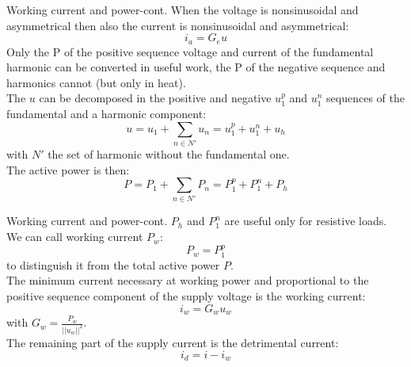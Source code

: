 \documentclass[aspectratio=169]{beamer}
\begin{document}
  \begin{frame}{Working current and power-cont.}{\insertsection}
    When the voltage is nonsinusoidal and asymmetrical then also the current is nonsinusoidal and asymmetrical: 
    \begin{equation}
      \pmb{\mathit{i}}_a = G_e \pmb{\mathit{u}}
    \end{equation} 
    Only the P of the positive sequence voltage and current of the fundamental harmonic can be converted in useful work, the P of the negative sequence and harmonics cannot (but only in heat). \\
    The  $ \pmb{\mathit{u}}$ can be decomposed in the positive and negative $ \pmb{\mathit{u}}_{1}^{p}$ and $ \pmb{\mathit{u}}_{1}^{n}$ sequences of the fundamental and a harmonic component:
    \begin{equation}
      \pmb{\mathit{u}} =\pmb{\mathit{u}}_{1} + \sum_{n\in N'}\pmb{\mathit{u}}_{n} = \pmb{\mathit{u}}_{1}^{p} + \pmb{\mathit{u}}_{1}^{n} + \pmb{\mathit{u}}_{h}
    \end{equation}
    with $N'$ the set of harmonic without the fundamental one.\\
    The active power is then:
    \begin{equation}
      P =P_{1} + \sum_{n\in N'}P_{n} = P_{1}^{p} + P_{1}^{n} + P_{h}
    \end{equation}

  \end{frame}

  \begin{frame}{Working current and power-cont.}{\insertsection}
    $P_h$ and $P_1^n$ are useful only for resistive loads. We can call \textcolor{NTNU_orange}{working current $P_w$}:
    \begin{equation}
      P_w = P_{1}^{p} 
    \end{equation}  
    to distinguish it from the total active power $P$.\\
    The minimum current necessary at working power and proportional to the positive sequence component of the supply voltage is the \textcolor{NTNU_orange}{working current}:
    \begin{equation}
      \pmb{\mathit{i}}_w = G_w \pmb{\mathit{u}}_w
    \end{equation}
    with $G_w=\frac{P_w}{||\pmb{\mathit{u}}_w||^2}$.\\
    The remaining part of the supply current is the \textcolor{NTNU_orange}{detrimental current}:
    \begin{equation}
      \pmb{\mathit{i}}_d = \pmb{\mathit{i}} - \pmb{\mathit{i}}_w
    \end{equation}
  \end{frame}
\end{document}
